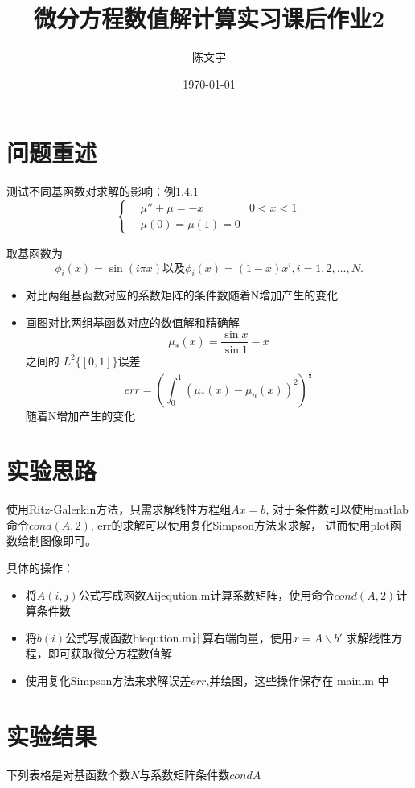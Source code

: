 \documentclass{article}
\title{微分方程数值解计算实习课后作业2}
\author{陈文宇}
\date{\today}
\begin{document}
\maketitle

\tableofcontents

\newpage
\section{问题重述}
测试不同基函数对求解的影响：例$1.4.1$
\[
\left\{
\begin{aligned}
	&\mu '' + \mu = -x &0<x<1 
	\\
	&\mu(0)=\mu(1)=0 &
\end{aligned}
\right.
\]

取基函数为
$$\phi_{i}(x)=\sin(i\pi x) 以及 \phi_{i}(x)=(1-x)x^{i},i=1,2,\dots,N.$$

\begin{itemize}
    \item 对比两组基函数对应的系数矩阵的条件数随着N增加产生的变化
    \item 画图对比两组基函数对应的数值解和精确解$$\mu_{*}(x)=\frac{\sin{x}}{\sin{1}}-x$$
    之间的 $L^{2}\{[0,1]\}$误差:
    $$ err=(\int^{1}_{0}(\mu_{*}(x)-\mu_{n}(x))^{2})^{\frac{1}{2}}$$
    随着N增加产生的变化
\end{itemize}
 
\section{实验思路}
使用Ritz-Galerkin方法，只需求解线性方程组$Ax=b$,
对于条件数可以使用matlab命令$cond(A,2)$,
err的求解可以使用复化Simpson方法来求解，
进而使用plot函数绘制图像即可。

具体的操作：
\begin{itemize}
    \item 将$A(i,j)$公式写成函数Aijeqution.m计算系数矩阵，使用命令$cond(A,2)$计算条件数
    \item 将$b(i)$公式写成函数bieqution.m计算右端向量，使用$x=A\backslash b'$ 求解线性方程，即可获取微分方程数值解
    \item 使用复化Simpson方法来求解误差$err$,并绘图，这些操作保存在 main.m 中
      
\end{itemize}



\section{实验结果}
下列表格是对基函数个数$N$与系数矩阵条件数$condA$
\end{document}
